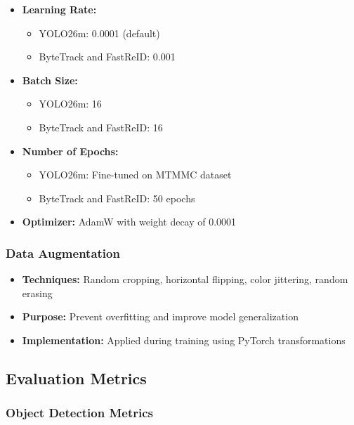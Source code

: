 \begin{itemize}
    \item \textbf{Learning Rate:} 
    \begin{itemize}
        \item YOLO26m: 0.0001 (default)
        \item ByteTrack and FastReID: 0.001
    \end{itemize}
    \item \textbf{Batch Size:} 
    \begin{itemize}
        \item YOLO26m: 16
        \item ByteTrack and FastReID: 16
    \end{itemize}
    \item \textbf{Number of Epochs:}
    \begin{itemize}
        \item YOLO26m: Fine-tuned on MTMMC dataset
        \item ByteTrack and FastReID: 50 epochs
    \end{itemize}
    \item \textbf{Optimizer:} AdamW with weight decay of 0.0001
\end{itemize}

\subsubsection{Data Augmentation}
\label{subsubsection:data-augmentation}

\begin{itemize}
    \item \textbf{Techniques:} Random cropping, horizontal flipping, color jittering, random erasing
    \item \textbf{Purpose:} Prevent overfitting and improve model generalization
    \item \textbf{Implementation:} Applied during training using PyTorch transformations
\end{itemize}

\subsection{Evaluation Metrics}
\label{subsection:evaluation-metrics}

\subsubsection{Object Detection Metrics}
\label{subsubsection:detection-metrics}

